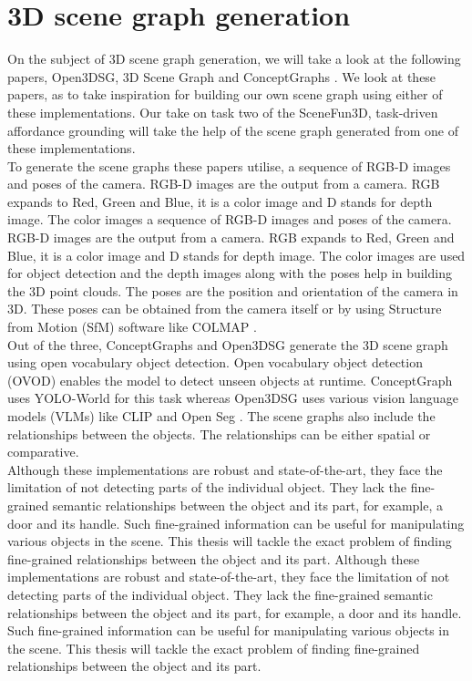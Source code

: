  \section{3D scene graph generation}
On the subject of 3D scene graph generation, we will take a look at the following papers, 
Open3DSG\cite{koch2024open3dsgopenvocabulary3dscene}, 3D Scene Graph \cite{armeni20193d} and ConceptGraphs \cite{gu2023conceptgraphsopenvocabulary3dscene}. 
We look at these papers, as to take inspiration for building our own scene graph 
using either of these implementations. Our take on task two of the SceneFun3D, task-driven affordance grounding will 
take the help of the scene graph generated from one of these implementations. \\
To generate the scene graphs these papers utilise,
a sequence of RGB-D images and poses of the camera. RGB-D images are the output from a camera.
RGB expands to Red, Green and Blue, it is a color image and D stands for depth image. The color images
a sequence of RGB-D images and poses of the camera. RGB-D images are the output from a camera.
RGB expands to Red, Green and Blue, it is a color image and D stands for depth image. The color images
are used for object detection and the depth images along with the poses help in building the 3D point clouds. The poses are
the position and orientation of the camera in 3D. These poses can be obtained from the camera itself or by using Structure from Motion (SfM) software like
COLMAP \cite{schoenberger2016mvs} \cite{schoenberger2016sfm}. \\ Out of the three, ConceptGraphs and 
Open3DSG generate the 3D scene graph using open vocabulary object detection. Open vocabulary
object detection (OVOD) enables the model to detect unseen objects at runtime. ConceptGraph uses YOLO-World \cite{cheng2024yolow} for this task whereas Open3DSG uses 
various vision language models (VLMs) like CLIP \cite{radford2021learningtransferablevisualmodels} and Open Seg \cite{ghiasi2022scalingopenvocabularyimagesegmentation}.
 The scene graphs also include the relationships between the 
objects. The relationships can be either spatial or comparative. \\
Although these implementations are robust and state-of-the-art, they face the limitation of not detecting
parts of the individual object. They lack the fine-grained semantic relationships between the object and its part, for example, a door and its handle.
Such fine-grained information can be useful for manipulating various objects in the scene. This thesis will tackle the exact problem of 
finding fine-grained relationships between the object and its part.
Although these implementations are robust and state-of-the-art, they face the limitation of not detecting
parts of the individual object. They lack the fine-grained semantic relationships between the object and its part, for example, a door and its handle.
Such fine-grained information can be useful for manipulating various objects in the scene. This thesis will tackle the exact problem of 
finding fine-grained relationships between the object and its part.

